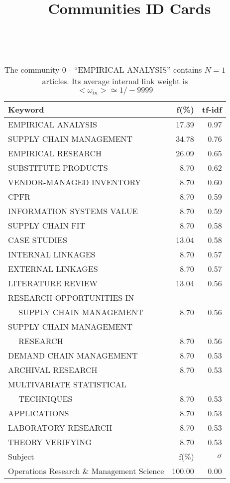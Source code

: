 \documentclass[a4paper,11pt]{report}
\title{{\bf Communities ID Cards}}
\date{\begin{flushleft}This document gather the ``ID Cards'' of the CC communities found within your database.\\
 The CC network was built by keeping a link between articles sharing at least 5 references. The communities characterized here correspond to the ones found in the level 0 (in the sense of the Louvain algo) which gathers more than 0 articles.\\
 These ID cards displays the most frequent keywords, subject categories, journals of publication, institution, countries, authors, references and reference journals of the articles of each community. The significance of an item $\sigma = \sqrt{N} (f - p) / \sqrt{p(1-p)}$ [where $N$ is the number of articles within the community and $f$ and $p$ are the proportion of articles respectively within the community and within the database displaying that item ] is also given (for example $\sigma > 5$ is really highly significant). The tf-idf value which can be calculated by $tf-idf = f*log(frac{1}{p})$ is also given.\\
\vspace{1cm}
\copyright Sebastian Grauwin, Liu Weizhi - (2014) \end{flushleft}}
\begin{document}
\begin{landscape}
\maketitle
\clearpage

\begin{table}[!ht]
\caption{The community 0 - ``EMPIRICAL ANALYSIS'' contains $N = 1$ articles. Its average internal link weight is $<\omega_{in}> \simeq 1/-9999$ }
\textcolor{white}{aa}\\
{\scriptsize\begin{tabular}{|l r  r|}
\hline
Keyword & f(\%) & tf-idf \\
\hline
EMPIRICAL ANALYSIS & 17.39 & 0.97\\
SUPPLY CHAIN MANAGEMENT & 34.78 & 0.76\\
EMPIRICAL RESEARCH & 26.09 & 0.65\\
SUBSTITUTE PRODUCTS & 8.70 & 0.62\\
VENDOR-MANAGED INVENTORY & 8.70 & 0.60\\
CPFR & 8.70 & 0.59\\
INFORMATION SYSTEMS VALUE & 8.70 & 0.59\\
SUPPLY CHAIN FIT & 8.70 & 0.58\\
CASE STUDIES & 13.04 & 0.58\\
INTERNAL LINKAGES & 8.70 & 0.57\\
EXTERNAL LINKAGES & 8.70 & 0.57\\
LITERATURE REVIEW & 13.04 & 0.56\\
RESEARCH OPPORTUNITIES IN &  &\\
$\quad$ SUPPLY CHAIN MANAGEMENT & 8.70 & 0.56\\
SUPPLY CHAIN MANAGEMENT &  &\\
$\quad$ RESEARCH & 8.70 & 0.56\\
DEMAND CHAIN MANAGEMENT & 8.70 & 0.53\\
ARCHIVAL RESEARCH & 8.70 & 0.53\\
MULTIVARIATE STATISTICAL &  &\\
$\quad$ TECHNIQUES & 8.70 & 0.53\\
APPLICATIONS & 8.70 & 0.53\\
LABORATORY RESEARCH & 8.70 & 0.53\\
THEORY VERIFYING & 8.70 & 0.53\\
\hline
\hline
Subject & f(\%) & $\sigma$\\
\hline
Operations Research \& Management Science & 100.00 & 0.00\\

\end{tabular}}
\end{table}
\end{landscape}
\end{document}
